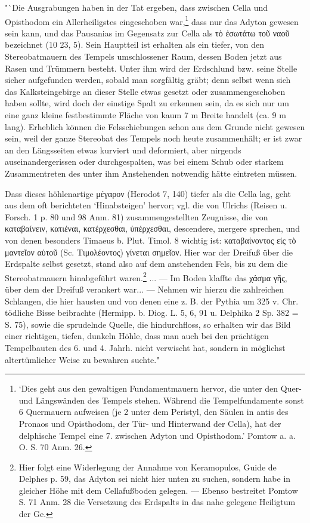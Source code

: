 \documentclass[a4paper, 11pt, oneside]{article}
\begin{document}
"`Die Ausgrabungen haben in der Tat ergeben, dass zwischen Cella und Opisthodom ein Allerheiligstes eingeschoben war,\footnote{`Dies geht aus den gewaltigen Fundamentmauern hervor, die unter den Quer- und Längswänden des Tempels stehen. Während die Tempelfundamente sonst 6 Quermauern aufweisen (je 2 unter dem Peristyl, den Säulen in antis des Pronaos und Opisthodom, der Tür- und Hinterwand der Cella), hat der delphische Tempel eine 7. zwischen Adyton und Opisthodom.' Pomtow a. a. O. S. 70 Anm. 26.} dass nur das Adyton gewesen sein kann, und das Pausanias im Gegensatz zur Cella als τὸ ἐσωτάτω τοῦ ναοῦ bezeichnet (10 23, 5). Sein Hauptteil ist erhalten als ein tiefer, von den Stereobatmauern des Tempels umschlossener Raum, dessen Boden jetzt aus Rasen und Trümmern besteht. Unter ihm wird der Erdschlund bzw. seine Stelle sicher aufgefunden werden, sobald man sorgfältig gräbt; denn selbst wenn sich das Kalksteingebirge an dieser Stelle etwas gesetzt oder zusammengeschoben haben sollte, wird doch der einstige Spalt zu erkennen sein, da es sich nur um eine ganz kleine festbestimmte Fläche von kaum 7 m Breite handelt (ca. 9 m lang). Erheblich können die Felsschiebungen schon aus dem Grunde nicht gewesen sein, weil der ganze Stereobat des Tempels noch heute zusammenhält; er ist zwar an den Längsseiten etwas kurviert und deformiert, aber nirgends auseinandergerissen oder durchgespalten, was bei einem Schub oder starkem Zusammentreten des unter ihm Anstehenden notwendig hätte eintreten müssen.

Dass dieses höhlenartige μέγαρον (Herodot 7, 140) tiefer als die Cella lag, geht aus dem oft berichteten `Hinabsteigen' hervor; vgl. die von Ulrichs (Reisen u. Forsch. 1 p. 80 und 98 Anm. 81) zusammengestellten Zeugnisse, die von καταβαίνειν, κατιέναι, κατέρχεσθαι, ὑπέρχεσθαι, descendere, mergere sprechen, und von denen besonders Timaeus b. Plut. Timol. 8 wichtig ist: καταβαίνοντος εἰς τὸ μαντεῖον αὐτοῦ (Sc. Τιμολέοντος) γίνεται σημεῖον. Hier war der Dreifuß über die Erdspalte selbst gesetzt, stand also auf dem anstehenden Fels, bis zu dem die Stereobatmauern hinabgeführt waren.\footnote{Hier folgt eine Widerlegung der Annahme von Keramopulos, Guide de Delphes p. 59, das Adyton sei nicht hier unten zu suchen, sondern habe in gleicher Höhe mit dem Cellafußboden gelegen. --- Ebenso bestreitet Pomtow S. 71 Anm. 28 die Versetzung des Erdspalts in das nahe gelegene Heiligtum der Ge.} ... --- Im Boden klaffte das χάσμα γῆς, über dem der Dreifuß verankert war... --- Nehmen wir hierzu die zahlreichen Schlangen, die hier hausten und von denen eine z. B. der Pythia um 325 v. Chr. tödliche Bisse beibrachte (Hermipp. b. Diog. L. 5, 6, 91 u. Delphika 2 Sp. 382 = S. 75), sowie die sprudelnde Quelle, die hindurchfloss, so erhalten wir das Bild einer richtigen, tiefen, dunkeln Höhle, dass man auch bei den prächtigen Tempelbauten des 6. und 4. Jahrh. nicht verwischt hat, sondern in möglichst altertümlicher Weise zu bewahren suchte."
\end{document}

